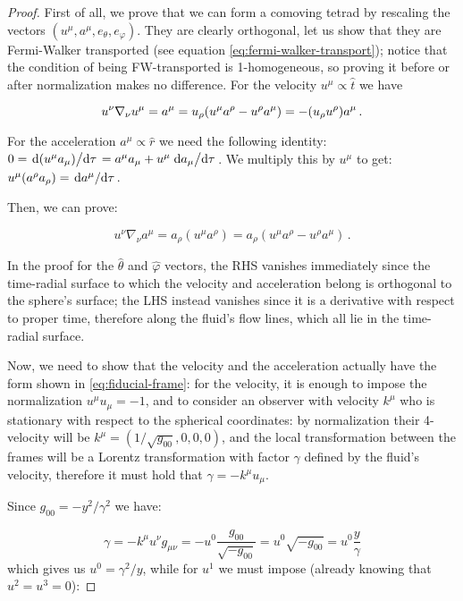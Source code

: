 \documentclass[main.tex]{subfiles}
\begin{document}
\begin{proof}
    First of all, we prove that we can form a comoving tetrad by rescaling the vectors \((u^\mu, a^\mu, e_\theta, e_\varphi)\). They are clearly orthogonal, let us show that they are Fermi-Walker transported (see equation \eqref{eq:fermi-walker-transport}); notice that the condition of being FW-transported is 1-homogeneous, so proving it before or after normalization makes no difference.
    For the velocity \(u^\mu \propto \hat{t}\)  we have

    \begin{equation}
        u^\nu \nabla_\nu u^\mu = a^\mu = u_\rho \qty(u^\mu a^\rho - u^\rho a^\mu) = - (u_\rho u^\rho) a^\mu \,.
    \end{equation}

    For the acceleration \(a^\mu \propto \hat{r} \) we need the following identity: \(0=\dv*{(u^\mu a_\mu)}{\tau} =a^\mu a_\mu + u^\mu \dv*{a_\mu}{\tau} \). We multiply this by \(u^\mu\) to get: \(u^\mu (a^\rho a_\rho) = \dv*{a^\mu}{\tau}\).

    Then, we can prove:

    \begin{equation}
      u^\nu \nabla_\nu a^\mu
      = a_\rho (u^\mu a^\rho)
      = a_\rho (u^\mu a^\rho - u^\rho a^\mu)\,.
    \end{equation}

    In the proof for the \(\hat{\theta} \) and \(\hat\varphi\) vectors, the RHS vanishes immediately since the time-radial surface to which the velocity and acceleration belong is orthogonal to the sphere's surface; the LHS instead vanishes since it is a derivative with respect to proper time, therefore along the fluid's flow lines, which all lie in the time-radial surface.

    Now, we need to show that the velocity and the acceleration actually have the form shown in \eqref{eq:fiducial-frame}: for the velocity, it is enough to impose the normalization \(u^\mu u_\mu = -1 \), and to consider an observer with velocity  \(k^\mu\) who is stationary with respect to the spherical coordinates: by normalization their 4-velocity will be \(k^\mu = (1/\sqrt{g_{00}}, 0,0,0)\), and the local transformation between the frames will be a Lorentz transformation with factor \(\gamma\) defined by the fluid's velocity, therefore it must hold that \(\gamma = - k^\mu u_\mu\).

    Since \(g_{00} = - y^2 / \gamma^2\) we have:

    \begin{equation}
      \gamma = - k^\mu u^\nu g_{\mu\nu} = - u^0 \frac{g_{00}}{\sqrt{-g_{00}} }
      = u^0 \sqrt{-g_{00}} = u^0 \frac{y}{\gamma}
    \end{equation}
    which gives us \(u^0 = \gamma^2 / y\), while for \(u^1\) we must impose (already knowing that \(u^2 = u^3 = 0\)):


\end{proof}
\end{document}
